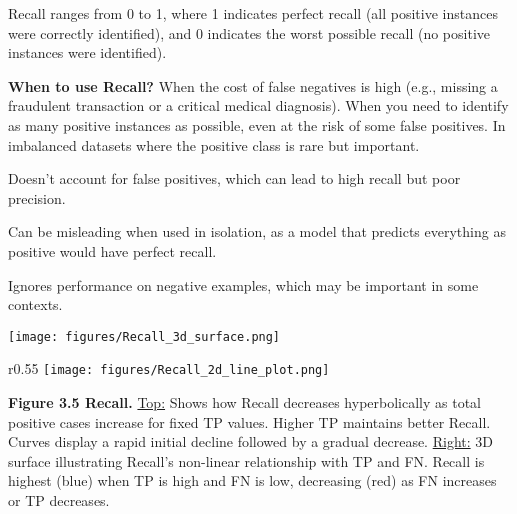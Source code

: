 Recall ranges from 0 to 1, where 1 indicates perfect recall (all positive instances were correctly identified), and 0 indicates the worst
possible recall (no positive instances were identified).

\textbf{When to use Recall?}
When the cost of false negatives is high (e.g., missing a fraudulent transaction or a critical medical diagnosis).
When you need to identify as many positive instances as possible, even at the risk of some false positives. In imbalanced datasets where the positive class is rare but important.

{
\item Doesn't account for false positives, which can lead to high recall but poor precision.
\item Can be misleading when used in isolation, as a model that predicts everything as positive would have perfect recall.
\item Ignores performance on negative examples, which may be important in some contexts.
}


\clearpage
\thispagestyle{customstyle}


\begin{figure*}[ht!]
    \centering
    \texttt{[image: figures/Recall\_3d\_surface.png]}
\end{figure*}

\begin{wrapfigure}{r}{0.55\textwidth}
    \centering
    \vspace{-20pt} %
    \texttt{[image: figures/Recall\_2d\_line\_plot.png]} %
\end{wrapfigure}

\textbf{Figure 3.5 Recall.} 
\underline{Top:}
Shows how Recall decreases hyperbolically as total positive cases increase for fixed TP values. Higher TP maintains better Recall.
Curves display a rapid initial decline followed by a gradual decrease.
\underline{Right:}
3D surface illustrating Recall's non-linear relationship with TP and FN. Recall is highest (blue) when TP is high and FN is low, decreasing (red) as FN increases or TP decreases.

